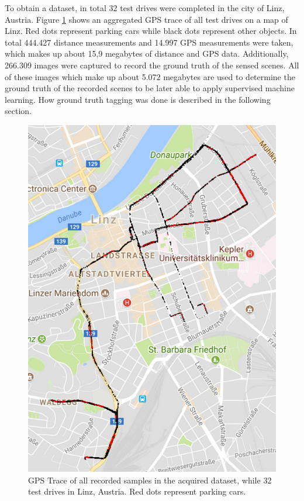 To obtain a dataset, in total 32 test drives were completed in the city of Linz, Austria. Figure \ref{fig:gps_locations_dataset} shows an aggregated GPS trace of all test drives on a map of Linz. Red dots represent parking cars while black dots represent other objects. In total 444.427 distance measurements and 14.997 GPS measurements were taken, which makes up about 15,9 megabytes of distance and GPS data. 
Additionally, 266.309 images were captured to record the ground truth of the sensed scenes. All of these images which make up about 5.072 megabytes are used to determine the ground truth of the recorded scenes to be later able to apply supervised machine learning. How ground truth tagging was done is described in the following section.



\begin{figure}
	\centering
	\includegraphics{img/gps_data_recorded_data_parking_spaces.PNG}
	\caption{GPS Trace of all recorded samples in the acquired dataset, while 32 test drives in Linz, Austria. Red dots represent parking cars.}
	\label{fig:gps_locations_dataset}
\end{figure}




